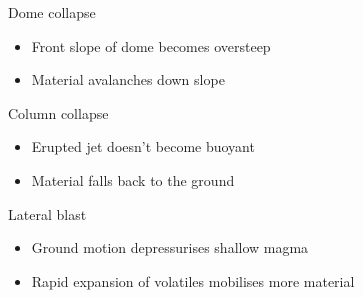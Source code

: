 \documentclass{beamer}
\begin{document}
\begin{frame}
\begin{columns}[t]
\begin{column}{0.5\paperwidth}
      Dome collapse

      \begin{itemize}
      \item Front slope of dome becomes oversteep \\
      \item Material avalanches down slope \\
      \end{itemize}

      Column collapse

      \begin{itemize}
      \item Erupted jet doesn't become buoyant \\
      \item Material falls back to the ground  \\
      \end{itemize}

      Lateral blast

      \begin{itemize}
      \item Ground motion depressurises shallow magma \\
      \item Rapid expansion of volatiles mobilises more material  \\
      \end{itemize}
    \end{column}

  \end{columns}
  
\end{frame}
\end{document}
